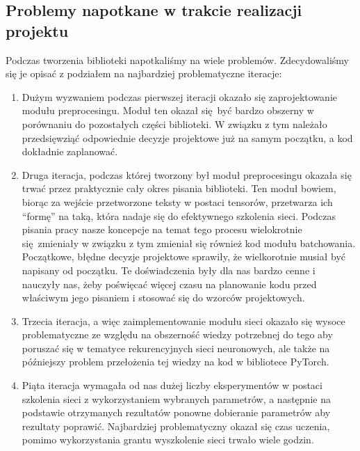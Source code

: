 \subsection{Problemy napotkane w trakcie realizacji projektu}
Podczas tworzenia biblioteki napotkaliśmy na wiele problemów. Zdecydowaliśmy się je opisać z podziałem na 
najbardziej problematyczne iteracje:

\begin{enumerate}
  \item Dużym wyzwaniem podczas pierwszej iteracji okazało
  się zaprojektowanie modułu preprocesingu. Moduł ten okazał się być bardzo obszerny w porównaniu do
  pozostałych części biblioteki. W związku z tym należało przedsięwziąć odpowiednie decyzje projektowe 
  już na samym początku, a kod dokładnie zaplanować.
  
  \item Druga iteracja, podczas której tworzony był moduł preprocesingu okazała się trwać przez praktycznie
  cały okres pisania biblioteki. Ten moduł bowiem, biorąc za wejście przetworzone teksty w postaci tensorów,
  przetwarza ich ``formę'' na taką, która nadaje się do efektywnego szkolenia sieci. Podczas pisania pracy 
  nasze koncepcje na temat tego procesu wielokrotnie się zmieniały w związku z tym zmieniał się również
  kod modułu batchowania. Początkowe, błędne decyzje projektowe sprawiły, że wielkorotnie musiał być 
  napisany od początku. Te doświadczenia były dla nas bardzo cenne i nauczyły nas, żeby poświęcać
  więcej czasu na planowanie kodu przed właściwym jego pisaniem i stosować się do wzorców projektowych.

  \item Trzecia iteracja, a więc zaimplementowanie modułu sieci okazało się wysoce problematyczne ze względu na obszerność 
  wiedzy potrzebnej do tego aby poruszać się w tematyce rekurencyjnych sieci neuronowych, ale także
  na późniejszy problem przełożenia tej wiedzy na kod w bibliotece PyTorch.
  
  \item Piąta iteracja wymagała od nas dużej liczby eksperymentów w postaci szkolenia sieci z wykorzystaniem wybranych
  parametrów, a następnie na podstawie otrzymanych rezultatów ponowne dobieranie parametrów aby rezultaty poprawić.
  Najbardziej problematyczny okazał się czas uczenia, pomimo wykorzystania grantu wyszkolenie sieci trwało
  wiele godzin.
\end{enumerate}
